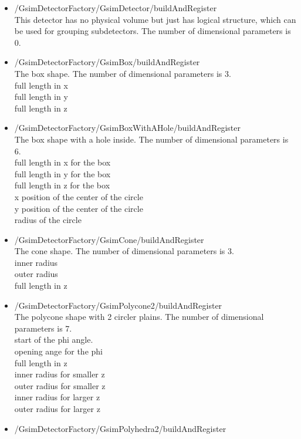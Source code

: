 \documentclass[a4paper,12pt]{article}
\begin{document}
 \begin{itemize}
  \item /GsimDetectorFactory/GsimDetector/buildAndRegister\\
	This detector has no physical volume but just has logical
	structure, which can be used for grouping subdetectors.
	The number of dimensional parameters is 0.
  \item /GsimDetectorFactory/GsimBox/buildAndRegister\\
	The box shape.
	The number of dimensional parameters is 3.\\
	full length in x\\
	full length in y\\
	full length in z
  \item /GsimDetectorFactory/GsimBoxWithAHole/buildAndRegister\\
	The box shape with a hole inside.
	The number of dimensional parameters is 6.\\
	full length in x for the box\\
	full length in y for the box\\
	full length in z for the box\\
	x position of the center of the circle\\
	y position of the center of the circle\\
	radius of the circle
  \item /GsimDetectorFactory/GsimCone/buildAndRegister\\
	The cone shape.
	The number of dimensional parameters is 3.\\
	inner radius\\
	outer radius\\
	full length in z
  \item /GsimDetectorFactory/GsimPolycone2/buildAndRegister\\
	The polycone shape with 2 circler plains.
	The number of dimensional parameters is 7.\\
	start of the phi angle.\\
	opening ange for the phi\\
	full length in z\\
	inner radius for smaller z\\
	outer radius for smaller z\\
	inner radius for larger z\\
	outer radius for larger z
  \item /GsimDetectorFactory/GsimPolyhedra2/buildAndRegister\\

\end{itemize}
\end{document}

